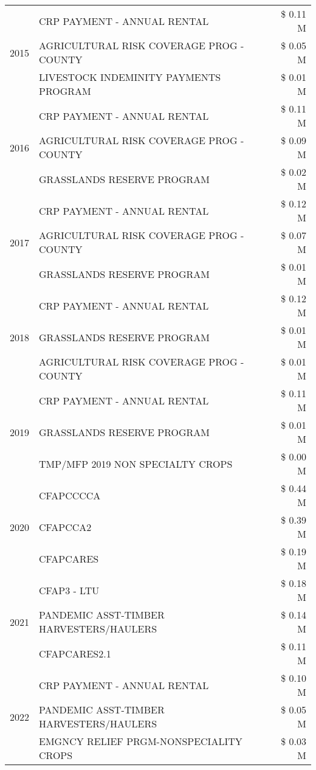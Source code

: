 \begin{tabular}{llr}
\cline{1-3}
\multirow[t]{3}{*}{2015} & CRP PAYMENT - ANNUAL RENTAL & \$ 0.11 M \\
 & AGRICULTURAL RISK COVERAGE PROG - COUNTY & \$ 0.05 M \\
 & LIVESTOCK INDEMINITY PAYMENTS PROGRAM & \$ 0.01 M \\
\cline{1-3}
\multirow[t]{3}{*}{2016} & CRP PAYMENT - ANNUAL RENTAL & \$ 0.11 M \\
 & AGRICULTURAL RISK COVERAGE PROG - COUNTY & \$ 0.09 M \\
 & GRASSLANDS RESERVE PROGRAM & \$ 0.02 M \\
\cline{1-3}
\multirow[t]{3}{*}{2017} & CRP PAYMENT - ANNUAL RENTAL & \$ 0.12 M \\
 & AGRICULTURAL RISK COVERAGE PROG - COUNTY & \$ 0.07 M \\
 & GRASSLANDS RESERVE PROGRAM & \$ 0.01 M \\
\cline{1-3}
\multirow[t]{3}{*}{2018} & CRP PAYMENT - ANNUAL RENTAL & \$ 0.12 M \\
 & GRASSLANDS RESERVE PROGRAM & \$ 0.01 M \\
 & AGRICULTURAL RISK COVERAGE PROG - COUNTY & \$ 0.01 M \\
\cline{1-3}
\multirow[t]{3}{*}{2019} & CRP PAYMENT - ANNUAL RENTAL & \$ 0.11 M \\
 & GRASSLANDS RESERVE PROGRAM & \$ 0.01 M \\
 & TMP/MFP 2019 NON SPECIALTY CROPS & \$ 0.00 M \\
\cline{1-3}
\multirow[t]{3}{*}{2020} & CFAPCCCCA & \$ 0.44 M \\
 & CFAPCCA2 & \$ 0.39 M \\
 & CFAPCARES & \$ 0.19 M \\
\cline{1-3}
\multirow[t]{3}{*}{2021} & CFAP3 - LTU & \$ 0.18 M \\
 & PANDEMIC ASST-TIMBER HARVESTERS/HAULERS & \$ 0.14 M \\
 & CFAPCARES2.1 & \$ 0.11 M \\
\cline{1-3}
\multirow[t]{3}{*}{2022} & CRP PAYMENT - ANNUAL RENTAL & \$ 0.10 M \\
 & PANDEMIC ASST-TIMBER HARVESTERS/HAULERS & \$ 0.05 M \\
 & EMGNCY RELIEF PRGM-NONSPECIALITY CROPS & \$ 0.03 M \\
\cline{1-3}
\bottomrule
\end{tabular}
